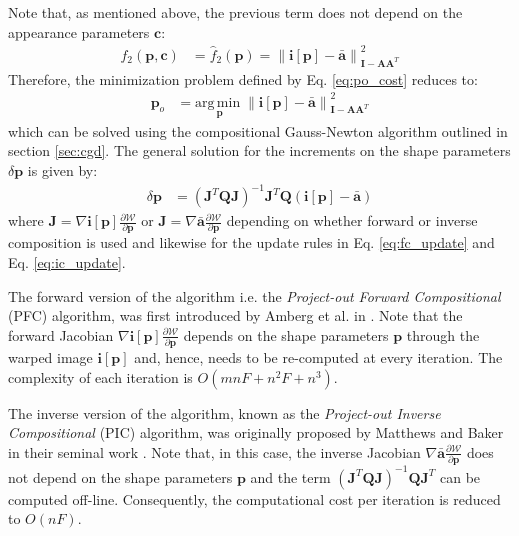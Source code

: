 Note that, as mentioned above, the previous term does not depend on the appearance parameters $\mathbf{c}$:
\begin{equation}
    \begin{aligned}
        f_2(\mathbf{p}, \mathbf{c}) & = \hat{f}_2(\mathbf{p}) = \left\| \mathbf{i}[\mathbf{p}] - \bar{\mathbf{a}} \right\|_{\mathbf{I} -\mathbf{A}\mathbf{A}^T }^2
    \label{eq:po_cost}
    \end{aligned}
\end{equation}
Therefore, the minimization problem defined by Eq. \ref{eq:po_cost} reduces to:
\begin{equation}
    \begin{aligned}
        \mathbf{p}_o & =  \underset{\mathbf{p}}{\mathrm{arg\,min\;}}  \left\| \mathbf{i}[\mathbf{p}] - \bar{\mathbf{a}} \right\|_{\mathbf{I} -\mathbf{A}\mathbf{A}^T }^2
    \label{eq:po_cost2}
    \end{aligned}
\end{equation}
which can be solved using the compositional Gauss-Newton algorithm outlined in section \ref{sec:cgd}. The general solution for the increments on the shape parameters $\delta\mathbf{p}$ is given by:
\begin{equation}
    \begin{aligned}
        \delta\mathbf{p} & =  \left( \mathbf{J}^T\mathbf{Q}\mathbf{J} \right)^{-1} \mathbf{J}^T\mathbf{Q} \left( \mathbf{i}[\mathbf{p}] - \bar{\mathbf{a}} \right)
    \label{eq:po_solution}
    \end{aligned}
\end{equation}
where $\mathbf{J} = \nabla \mathbf{i}[\mathbf{p}] \frac{\partial\mathcal{W}}{\partial\mathbf{p}}$ or $\mathbf{J} = \nabla \bar{\mathbf{a}} \frac{\partial\mathcal{W}}{\partial\mathbf{p}}$ 
depending on whether forward or inverse composition is used and likewise for the update rules in Eq. \ref{eq:fc_update} and Eq. \ref{eq:ic_update}.

The forward version of the algorithm i.e. the \emph{Project-out Forward Compositional} (PFC) algorithm, was first introduced by Amberg et al. in \cite{Amberg2009}. Note that the forward Jacobian $\nabla\mathbf{i}[\mathbf{p}] \frac{\partial\mathcal{W}}{\partial\mathbf{p}}$ depends on the shape parameters $\mathbf{p}$ through the warped image $\mathbf{i}[\mathbf{p}]$ and, hence, needs to be re-computed at every iteration. The complexity of each iteration is $O(mnF + n^2F + n^3)$.

The inverse version of the algorithm, known as the \emph{Project-out Inverse Compositional} (PIC) algorithm, was originally proposed by Matthews and Baker in their seminal work \cite{Matthews2004}. Note that, in this case, the inverse Jacobian $\nabla\bar{\mathbf{a}} \frac{\partial\mathcal{W}}{\partial\mathbf{p}}$ does not depend on the shape parameters $\mathbf{p}$ and the term $\left( \mathbf{J}^T\mathbf{Q}\mathbf{J} \right)^{-1} \mathbf{Q}\mathbf{J}^T$ can be computed off-line. Consequently, the computational cost per iteration is reduced to $O(nF)$.
